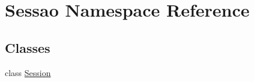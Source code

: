 \hypertarget{namespace_sessao}{}\section{Sessao Namespace Reference}
\label{namespace_sessao}
\subsection*{Classes}
\begin{DoxyCompactItemize}
\item 
class \hyperlink{class_sessao_1_1_session}{Session}
\end{DoxyCompactItemize}
